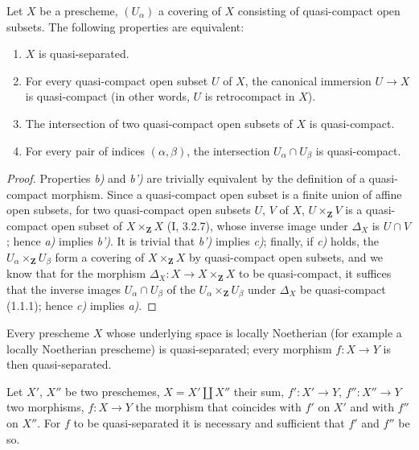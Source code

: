 \begin{proposition}[1.2.7]
\label{IV.1.2.7}
Let $X$ be a prescheme, $(U_\alpha)$ a covering of $X$ consisting of
quasi-compact open subsets. The following properties are equivalent:
\begin{enumerate}
  \item[a)] $X$ is quasi-separated.
  \item[b)] For every quasi-compact open subset $U$ of $X$, the canonical
  immersion $U\to X$ is quasi-compact (in other words, $U$ is retrocompact
  in $X$).
  \item[b')] The intersection of two quasi-compact open subsets of $X$ is
  quasi-compact.
  \item[c)] For every pair of indices $(\alpha,\beta)$, the intersection
  $U_\alpha\cap U_\beta$ is quasi-compact.
\end{enumerate}
\end{proposition}

\begin{proof}
Properties \emph{b)} and \emph{b')} are trivially equivalent by the
definition of a quasi-compact morphism. Since a quasi-compact open subset is a
finite union of affine open subsets, for two quasi-compact open subsets $U$,
$V$ of $X$, $U\times_{\mathbf Z}V$ is a quasi-compact open subset of
$X\times_{\mathbf Z}X$ (I, 3.2.7), whose inverse image under $\Delta_X$ is
$U\cap V$; hence \emph{a)} implies \emph{b')}. It is trivial that \emph{b')}
implies \emph{c)}; finally, if \emph{c)} holds, the
$U_\alpha\times_{\mathbf Z}U_\beta$ form a covering of
$X\times_{\mathbf Z}X$ by quasi-compact open subsets, and we know that for
the morphism $\Delta_X:X\to X\times_{\mathbf Z}X$ to be quasi-compact, it
suffices that the inverse images $U_\alpha\cap U_\beta$ of the
$U_\alpha\times_{\mathbf Z}U_\beta$ under $\Delta_X$ be quasi-compact
(1.1.1); hence \emph{c)} implies \emph{a)}.
\end{proof}

\begin{corollary}[1.2.8]
\label{IV.1.2.8}
Every prescheme $X$ whose underlying space is locally Noetherian (for
example a locally Noetherian prescheme) is quasi-separated; every morphism
$f:X\to Y$ is then quasi-separated.
\end{corollary}

\begin{proposition}[1.2.9]
\label{IV.1.2.9}
Let $X'$, $X''$ be two preschemes, $X=X'\coprod X''$ their sum,
$f':X'\to Y$, $f'':X''\to Y$ two morphisms, $f:X\to Y$ the morphism that
coincides with $f'$ on $X'$ and with $f''$ on $X''$. For $f$ to be
quasi-separated it is necessary and sufficient that $f'$ and $f''$ be so.
\end{proposition}

